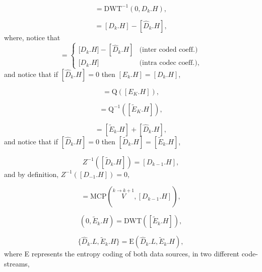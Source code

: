 \begin{equation}
  [D_k.H] = \text{DWT}^{-1}(0, D_k.H),
  \tag{h}
\end{equation}

\begin{equation}
  [E_k.H] = [D_k.H] - [\hat{D}_k.H],
  \tag{i}
\end{equation}
where, notice that
\begin{equation}
  [E_k.H] = \left\{
  \begin{array}{ll}
    {[}D_k.H{]} - [\hat{D}_k.H] & \text{(inter coded coeff.)} \\
    {[}D_k.H{]}                 & \text{(intra codec coeff.)},
  \end{array}
  \right.
\end{equation}
and notice that if $[\hat{D}_k.H]=0$ then $[E_k.H] = [D_k.H]$,

\begin{equation}
  [\tilde{E}_k.H] = \text{Q}([E_K.H]),
  \tag{j}
\end{equation}

\begin{equation}
  [\tilde{E}_k.H] = \text{Q}^{-1}([\tilde{E}_K.H]),
  \tag{k}
\end{equation}

\begin{equation}
  [\tilde{D}_k.H] = [\tilde{E}_k.H] + [\hat{D}_k.H],
  \tag{l}
\end{equation}
and notice that if $[\hat{D}_k.H]=0$ then $[\tilde{D}_k.H] =
[\tilde{E}_k.H]$,

\begin{equation}
  Z^{-1}([\tilde{D}_k.H]) = [D_{k-1}.H],
  \tag{m}
\end{equation}
and by definition, $Z^{-1}([D_{-1}.H]) = 0$,

\begin{equation}
  [\hat{D}_k.H] = \text{MCP}(\overset{k\rightarrow k+1}{V}, [D_{k-1}.H]),
  \tag{n}
\end{equation}

\begin{equation}
  (0, \tilde{E}_k.H) = \text{DWT}([\tilde{E}_k.H]),
  \tag{o}
\end{equation}

\begin{equation}
  \{\hat{D}_k.L, \tilde{E}_k.H\} = \text{E}(\hat{D}_k.L, \tilde{E}_k.H),
  \tag{p}
\end{equation}
where E represents the entropy coding of both data sources, in two
different code-streams,


